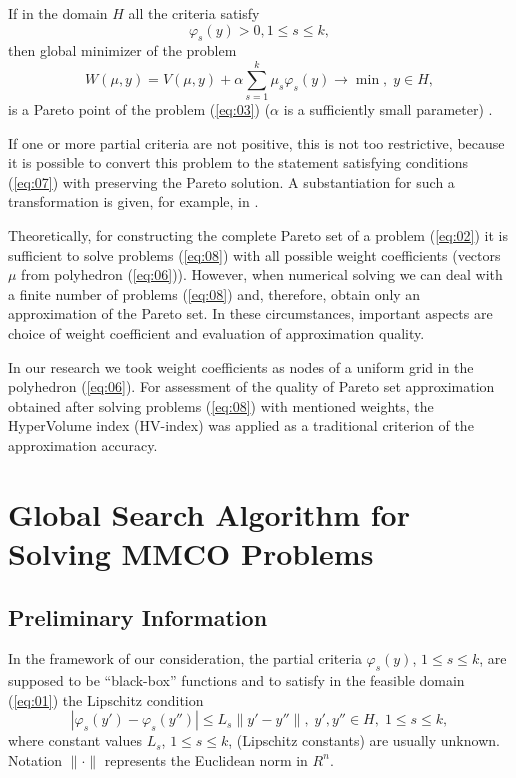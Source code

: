 \documentclass[runningheads]{llncs}
\begin{document}
If in the domain $H$ all the criteria satisfy
\begin{equation}
    \label{eq:07}
    \varphi_s(y) > 0, 1 \leq s \leq k,
\end{equation}
then global minimizer of the problem
\begin{equation}
    \label{eq:08}
    W(\mu, y) = V(\mu, y) + \alpha \sum_{s=1}^k \mu_s \varphi_s(y) \to \min, \; y \in H,
\end{equation}
is a Pareto point of the problem (\ref{eq:03}) ($\alpha$  is a sufficiently small parameter) \cite{Wierzbicki,Marler2004}.

If one or more partial criteria are not positive, this is not too restrictive, because it is possible to convert this problem to the statement satisfying conditions (\ref{eq:07}) with preserving the Pareto solution. A substantiation for such a transformation is given, for example, in \cite{Pardalos2017}.

Theoretically, for constructing the complete Pareto set of a problem (\ref{eq:02}) it is sufficient to solve problems (\ref{eq:08}) with all possible weight coefficients (vectors $\mu$ from polyhedron (\ref{eq:06})). However, when numerical solving we can deal with a finite number of problems (\ref{eq:08}) and, therefore, obtain only an approximation of the Pareto set. In these circumstances, important aspects are choice of weight coefficient and evaluation of approximation quality.

In our research we took weight coefficients as nodes of a uniform grid in the polyhedron (\ref{eq:06}). For assessment of the quality of Pareto set approximation obtained after solving problems (\ref{eq:08}) with mentioned weights, the HyperVolume index (HV-index) \cite{Evtushenko2014,Gergel2018} was applied as a traditional criterion of the approximation accuracy.


\section{Global Search Algorithm for Solving MMCO Problems}\label{sec:3}

\subsection{Preliminary Information}

In the framework of our consideration, the partial criteria $\varphi_s(y)$, $1 \leq s \leq k$, are supposed to be ``black-box'' functions and to satisfy in the feasible domain (\ref{eq:01}) the Lipschitz condition
\begin{equation}
    \label{eq:09}
    |\varphi_s(y') - \varphi_s(y'')| \leq L_s \|y'-y''\|, \; y', y'' \in H, \; 1 \leq s \leq k,
\end{equation}
where constant values $L_s$, $1 \leq s \leq k$, (Lipschitz constants) are usually unknown. Notation $\| \cdot \|$ represents the Euclidean norm in $R^n$.  
\end{document}
